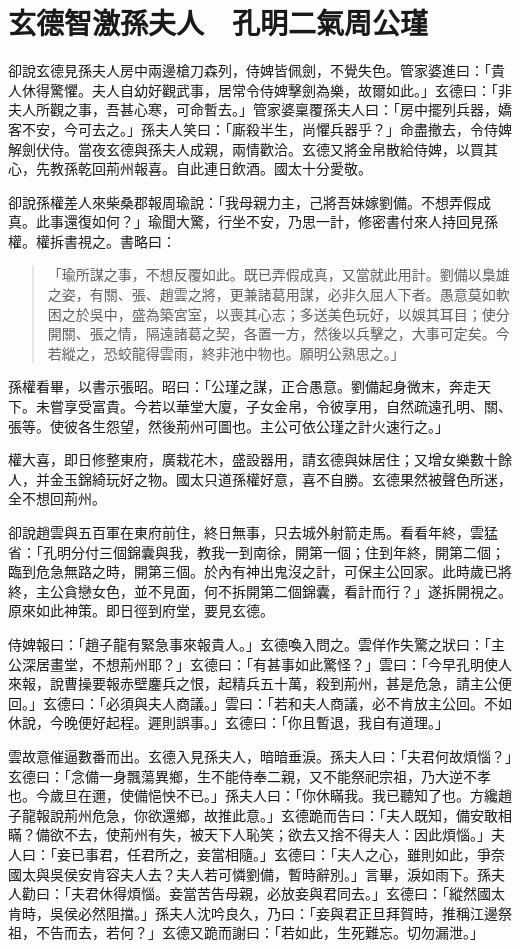 
\chapter{玄德智激孫夫人　孔明二氣周公瑾}

卻說玄德見孫夫人房中兩邊槍刀森列，侍婢皆佩劍，不覺失色。管家婆進曰：「貴人休得驚懼。夫人自幼好觀武事，居常令侍婢擊劍為樂，故爾如此。」玄德曰：「非夫人所觀之事，吾甚心寒，可命暫去。」管家婆稟覆孫夫人曰：「房中擺列兵器，嬌客不安，今可去之。」孫夫人笑曰：「廝殺半生，尚懼兵器乎？」命盡撤去，令侍婢解劍伏侍。當夜玄德與孫夫人成親，兩情歡洽。玄德又將金帛散給侍婢，以買其心，先教孫乾回荊州報喜。自此連日飲酒。國太十分愛敬。

卻說孫權差人來柴桑郡報周瑜說：「我母親力主，己將吾妹嫁劉備。不想弄假成真。此事還復如何？」瑜聞大驚，行坐不安，乃思一計，修密書付來人持回見孫權。權拆書視之。書略曰：

\begin{quote}
「瑜所謀之事，不想反覆如此。既已弄假成真，又當就此用計。劉備以梟雄之姿，有關、張、趙雲之將，更兼諸葛用謀，必非久屈人下者。愚意莫如軟困之於吳中，盛為築宮室，以喪其心志；多送美色玩好，以娛其耳目；使分開關、張之情，隔遠諸葛之契，各置一方，然後以兵擊之，大事可定矣。今若縱之，恐蛟龍得雲雨，終非池中物也。願明公熟思之。」
\end{quote}

孫權看畢，以書示張昭。昭曰：「公瑾之謀，正合愚意。劉備起身微末，奔走天下。未嘗享受富貴。今若以華堂大廈，子女金帛，令彼享用，自然疏遠孔明、關、張等。使彼各生怨望，然後荊州可圖也。主公可依公瑾之計火速行之。」

權大喜，即日修整東府，廣栽花木，盛設器用，請玄德與妹居住；又增女樂數十餘人，并金玉錦綺玩好之物。國太只道孫權好意，喜不自勝。玄德果然被聲色所迷，全不想回荊州。

卻說趙雲與五百軍在東府前住，終日無事，只去城外射箭走馬。看看年終，雲猛省：「孔明分付三個錦囊與我，教我一到南徐，開第一個；住到年終，開第二個；臨到危急無路之時，開第三個。於內有神出鬼沒之計，可保主公回家。此時歲已將終，主公貪戀女色，並不見面，何不拆開第二個錦囊，看計而行？」遂拆開視之。原來如此神策。即日徑到府堂，要見玄德。

侍婢報曰：「趙子龍有緊急事來報貴人。」玄德喚入問之。雲佯作失驚之狀曰：「主公深居畫堂，不想荊州耶？」玄德曰：「有甚事如此驚怪？」雲曰：「今早孔明使人來報，說曹操要報赤壁鏖兵之恨，起精兵五十萬，殺到荊州，甚是危急，請主公便回。」玄德曰：「必須與夫人商議。」雲曰：「若和夫人商議，必不肯放主公回。不如休說，今晚便好起程。遲則誤事。」玄德曰：「你且暫退，我自有道理。」

雲故意催逼數番而出。玄德入見孫夫人，暗暗垂淚。孫夫人曰：「夫君何故煩惱？」玄德曰：「念備一身飄蕩異鄉，生不能侍奉二親，又不能祭祀宗祖，乃大逆不孝也。今歲旦在邇，使備悒怏不已。」孫夫人曰：「你休瞞我。我已聽知了也。方纔趙子龍報說荊州危急，你欲還鄉，故推此意。」玄德跪而告曰：「夫人既知，備安敢相瞞？備欲不去，使荊州有失，被天下人恥笑；欲去又捨不得夫人：因此煩惱。」夫人曰：「妾已事君，任君所之，妾當相隨。」玄德曰：「夫人之心，雖則如此，爭奈國太與吳侯安肯容夫人去？夫人若可憐劉備，暫時辭別。」言畢，淚如雨下。孫夫人勸曰：「夫君休得煩惱。妾當苦告母親，必放妾與君同去。」玄德曰：「縱然國太肯時，吳侯必然阻擋。」孫夫人沈吟良久，乃曰：「妾與君正旦拜賀時，推稱江邊祭祖，不告而去，若何？」玄德又跪而謝曰：「若如此，生死難忘。切勿漏泄。」

